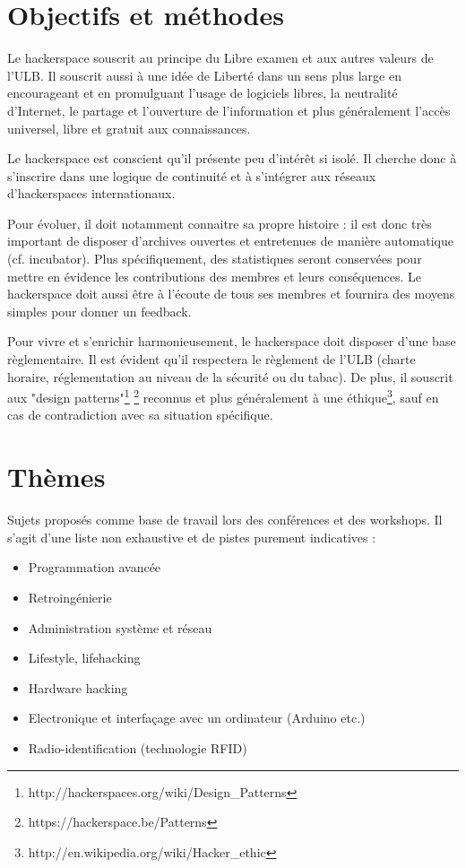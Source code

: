 \documentclass{article}
\begin{document}
\section{Objectifs et méthodes}

Le hackerspace souscrit au principe du Libre examen et aux autres valeurs de l'ULB.
Il souscrit aussi à une idée de Liberté dans un sens plus large en encourageant et en promulguant l'usage de logiciels libres, la neutralité d'Internet, le partage et l'ouverture de 
l'information et plus généralement l'accès universel, libre et gratuit aux connaissances.

Le hackerspace est conscient qu'il présente peu d'intérêt si isolé. Il cherche donc 
à s'inscrire dans une logique de continuité et à s'intégrer aux réseaux d'hackerspaces 
internationaux.

Pour évoluer, il doit notamment connaitre sa propre histoire : il est 
donc très important de disposer d'archives ouvertes et entretenues de manière 
automatique (cf. incubator). Plus spécifiquement, des statistiques seront 
conservées pour mettre en évidence les contributions des membres et leurs conséquences. 
Le hackerspace doit aussi être à l'écoute de tous ses membres et fournira des moyens simples pour 
donner un feedback. 

Pour vivre et s'enrichir harmonieusement, le hackerspace doit disposer d'une base 
règlementaire. Il est évident qu'il respectera le règlement de l'ULB 
(charte horaire, réglementation au niveau de la sécurité ou du tabac). De plus, il souscrit aux 
"design patterns"\footnote{http://hackerspaces.org/wiki/Design\_Patterns}
\footnote{https://hackerspace.be/Patterns} reconnus et plus généralement à une 
éthique\footnote{http://en.wikipedia.org/wiki/Hacker\_ethic}, sauf en cas de 
contradiction avec sa situation spécifique.


\section{Thèmes}

Sujets proposés comme base de travail lors des 
conférences et des workshops. Il s'agit d'une liste non exhaustive et de pistes purement indicatives :
\begin{itemize}
\item Programmation avancée
\item Retroingénierie
\item Administration système et réseau
\item Lifestyle, lifehacking
\item Hardware hacking
\item Electronique et interfaçage avec un ordinateur (Arduino etc.)
\item Radio-identification (technologie RFID)
\end{itemize}
\end{document}
